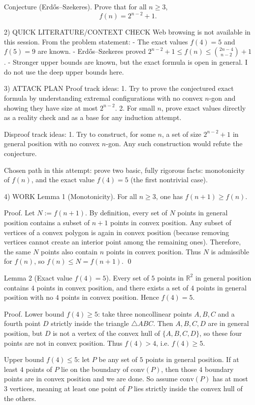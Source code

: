 Conjecture (Erd\H{o}s--Szekeres).
Prove that for all $n\ge 3$,
\[f(n)=2^{n-2}+1.\]

2) QUICK LITERATURE/CONTEXT CHECK
Web browsing is not available in this session.
From the problem statement:
- The exact values $f(4)=5$ and $f(5)=9$ are known.
- Erd\H{o}s--Szekeres proved $2^{n-2}+1\le f(n)\le \binom{2n-4}{n-2}+1$.
- Stronger upper bounds are known, but the exact formula is open in general.
I do not use the deep upper bounds here.

3) ATTACK PLAN
Proof track ideas:
1. Try to prove the conjectured exact formula by understanding extremal configurations with no convex $n$-gon and showing they have size at most $2^{n-2}$.
2. For small $n$, prove exact values directly as a reality check and as a base for any induction attempt.

Disproof track ideas:
1. Try to construct, for some $n$, a set of size $2^{n-2}+1$ in general position with no convex $n$-gon. Any such construction would refute the conjecture.

Chosen path in this attempt: prove two basic, fully rigorous facts: monotonicity of $f(n)$, and the exact value $f(4)=5$ (the first nontrivial case).

4) WORK
Lemma 1 (Monotonicity).
For all $n\ge 3$, one has $f(n+1)\ge f(n)$.

Proof.
Let $N:=f(n+1)$. By definition, every set of $N$ points in general position contains a subset of $n+1$ points in convex position.
Any subset of vertices of a convex polygon is again in convex position (because removing vertices cannot create an interior point among the remaining ones).
Therefore, the same $N$ points also contain $n$ points in convex position.
Thus $N$ is admissible for $f(n)$, so $f(n)\le N=f(n+1)$. \qed

Lemma 2 (Exact value $f(4)=5$).
Every set of $5$ points in $\mathbb R^2$ in general position contains $4$ points in convex position, and there exists a set of $4$ points in general position with no $4$ points in convex position.
Hence $f(4)=5$.

Proof.
Lower bound $f(4)\ge 5$: take three noncollinear points $A,B,C$ and a fourth point $D$ strictly inside the triangle $\triangle ABC$.
Then $A,B,C,D$ are in general position, but $D$ is not a vertex of the convex hull of $\{A,B,C,D\}$, so these four points are not in convex position.
Thus $f(4)>4$, i.e. $f(4)\ge 5$.

Upper bound $f(4)\le 5$: let $P$ be any set of $5$ points in general position.
If at least $4$ points of $P$ lie on the boundary of $\mathrm{conv}(P)$, then those $4$ boundary points are in convex position and we are done.
So assume $\mathrm{conv}(P)$ has at most $3$ vertices, meaning at least one point of $P$ lies strictly inside the convex hull of the others.

